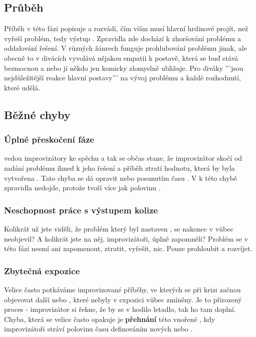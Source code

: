 \documentclass[main.tex]{subfiles}
\begin{document}
 
\subsection{ Průběh } Příběh v této fázi popisuje a rozvádí, čím vším musí hlavní hrdinové projít, než vyřeší problém, tedy výstup . Zpravidla zde dochází k zhoršování problému a oddalování řešení. V různých žánrech funguje prohlubování problému jinak, ale obecně to v divácích vyvolává nějakou empatii k postavě, která se buď stává bezmocnou a nebo jí někdo jen komicky zlomyslně ubližuje. Pro diváky '''jsou nejdůležitější reakce hlavní postavy''' na vývoj problému a každé rozhodnutí, které udělá.  
 
 
\subsection{ Běžné chyby }  
\subsubsection{ Úplné přeskočení fáze }  vedou improvizátory ke spěchu a tak se občas stane, že improvizátor skočí od zadání problému ihned k jeho řešení a příběh ztratí hodnotu, která by byla vytvořena . Tato chyba se dá opravit  nebo posunutím času . V  k této chybě zpravidla nedojde, protože  tvoří více jak polovinu . 
 
\subsubsection{ Neschopnost práce s výstupem kolize } Kolikrát už jste viděli, že problém který byl nastaven , se nakonec v  vůbec neobjevil? A kolikrát jste na něj, improvizátoři, úplně zapomněli? Problém se v této fázi nesmí ani zapomenout, ztratit, vyřešit, nic. Pouze prohloubit a rozvíjet. 
 
\subsubsection{ Zbytečná expozice } Velice často potkáváme improvizované příběhy, ve kterých se při krizi začnou objevovat další  nebo , které nebyly v expozici vůbec zmíněny. Je to přirozený proces - improvizátor si řekne, že by se v  hodilo letadlo, tak ho tam doplní. Chyba, která se velice často opakuje je \textbf{přehnání}{} této vnořené , kdy improvizátoři stráví polovinu času  definováním nových  nebo . 
 
\end{document}
